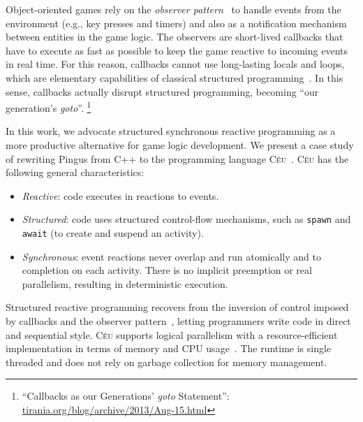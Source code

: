 \documentclass{vgtc}                          %
\newcommand{\CEU}{\textsc{C\'{e}u}\xspace}
\newcommand{\code}[1] {{\small{\texttt{#1}}}}
\begin{document}

Object-oriented games rely on the \emph{observer pattern}~\cite{games.patterns}
to handle events from the environment (e.g., key presses and timers) and also
as a notification mechanism between entities in the game logic.
%
The observers are short-lived callbacks that have to execute as fast as
possible to keep the game reactive to incoming events in real time.
%
For this reason, callbacks cannot use long-lasting locals and loops, which are
elementary capabilities of classical structured
programming~\cite{rp.deprecating,rp.rescala,sync_async.cooperative}.
%
In this sense, callbacks actually disrupt structured programming, becoming
``our generation's \emph{goto}''.%
\footnote{``Callbacks as our Generations' \emph{goto} Statement'':
\url{tirania.org/blog/archive/2013/Aug-15.html}}

In this work, we advocate structured synchronous reactive programming as a more
productive alternative for game logic development.
We present a case study of rewriting Pingus from C++ to the programming
language \CEU~\cite{ceu.sensys13,ceu.mod15}.
\CEU has the following general characteristics:
%
\begin{itemize}
\item \emph{Reactive}: code executes in reactions to events.
\item \emph{Structured}: code uses structured control-flow mechanisms, such
      as \code{spawn} and \code{await} (to create and suspend an activity).
\item \emph{Synchronous}: event reactions never overlap and run atomically and
      to completion on each activity.
      There is no implicit preemption or real parallelism, resulting in
      deterministic execution.
\end{itemize}
%
Structured reactive programming recovers from the inversion of control imposed
by callbacks and the observer pattern~\cite{rp.deprecating}, letting
programmers write code in direct and sequential style.
%
%
\CEU supports logical parallelism with a resource-efficient implementation in
terms of memory and CPU usage~\cite{ceu.sensys13}.
The runtime is single threaded and does not rely on garbage collection for
memory management.
\end{document}
